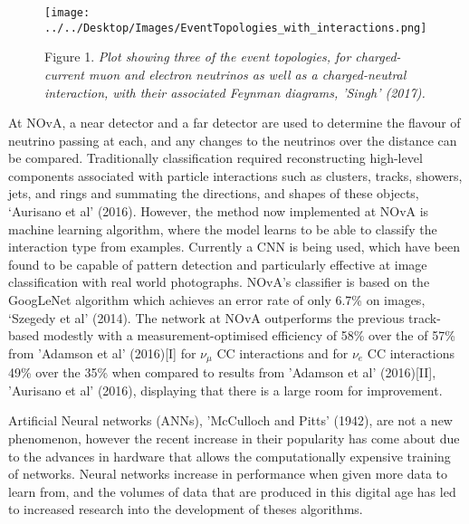 \documentclass[11pt]{article}
\begin{document}
\begin{figure}[t]
 \centering
 \texttt{[image: ../../Desktop/Images/EventTopologies\_with\_interactions.png]}
 
 Figure 1. \textit{Plot showing three of the event topologies, for charged-current muon and electron neutrinos as well as a charged-neutral interaction, with their associated Feynman diagrams, 'Singh' (2017).}
\end{figure}

At NOvA, a near detector and a far detector are used to determine the flavour of neutrino passing at each, and any changes to the neutrinos over the distance can be compared. Traditionally classification required reconstructing high-level components associated with particle interactions such as clusters, tracks, showers, jets, and rings and summating the directions, and shapes of these objects, ‘Aurisano et al’ (2016). However, the method now implemented at NOvA is machine learning algorithm, where the model learns to be able to classify the interaction type from examples. Currently a CNN is being used, which have been found to be capable of pattern detection and particularly effective at image classification with real world photographs. NOvA's classifier is based on the GoogLeNet algorithm which achieves an error rate of only 6.7\% on images, ‘Szegedy et al’ (2014). The network at NOvA outperforms the previous track-based modestly with a measurement-optimised efficiency of 58\% over the of 57\% from  'Adamson et al' (2016)[I] for $\nu_\mu$ CC interactions and for $\nu_e$ CC interactions 49\% over the 35\% when compared to results from 'Adamson et al' (2016)[II], 'Aurisano et al' (2016), displaying that there is a large room for improvement.

Artificial Neural networks (ANNs), 'McCulloch and Pitts' (1942), are not a new phenomenon, however the recent increase in their popularity has come about due to the advances in hardware that allows the computationally expensive training of networks. Neural networks increase in performance when given more data to learn from, and the volumes of data that are produced in this digital age has led to increased research into the development of theses algorithms. 
\end{document}
